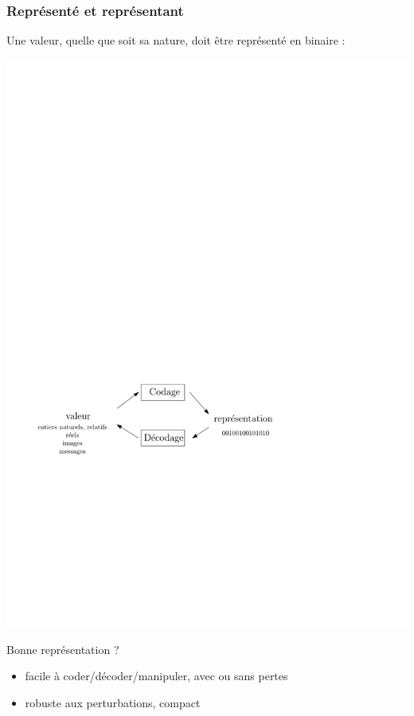 \documentclass{beamer}
\begin{document}
\begin{frame}
\frametitle{Représenté et représentant}
Une valeur, quelle que soit sa nature, doit être représenté en binaire :\\
\begin{center}\includegraphics[width=0.75\linewidth]{Figs/codage_decodage.pdf}\end{center}
Bonne représentation ?
\begin{itemize}
\item facile à coder/décoder/manipuler, avec ou sans pertes
\item robuste aux perturbations, compact
\end{itemize}
\end{frame}
\end{document}
